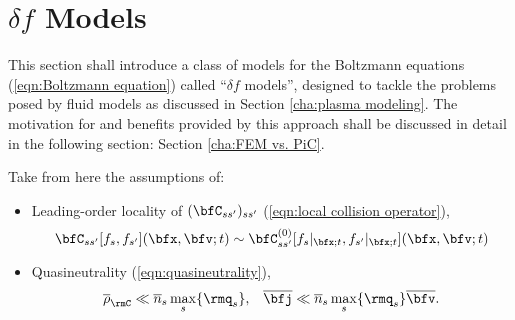 \section{$\delta\!f$ Models}\label{cha:delta f models}
    This section shall introduce a class of models for the Boltzmann equations (\ref{eqn:Boltzmann equation}) called ``$\delta\!f$ models'', designed to tackle the problems posed by fluid models as discussed in Section \ref{cha:plasma modeling}. The motivation for and benefits provided by this approach shall be discussed in detail in the following section: Section \ref{cha:FEM vs. PiC}.

    Take from here the assumptions of:
    \begin{itemize}
        \item  Leading-order locality of $(\bfC_{ss'})_{ss'}$ (\ref{eqn:local collision operator}),
        \begin{equation}
            \bfC_{ss'}[f_{s}, f_{s'}](\bfx, \bfv; t)  \sim  \bfC_{ss'}^{(0)}[f_{s}|_{\bfx; t}, f_{s'}|_{\bfx; t}](\bfx, \bfv; t)
        \end{equation}
        \item  Quasineutrality (\ref{eqn:quasineutrality}),
        \begin{align}
            \overline{\rho}_{\rmC}  \ll \overline{n}_{s}\max_{s}\{\rmq_{s}\},  &&
            \overline{\bfj}         \ll  \overline{n}_{s}\max_{s}\{\rmq_{s}\}\overline{\bfv}.
        \end{align}
    \end{itemize}

    \line

